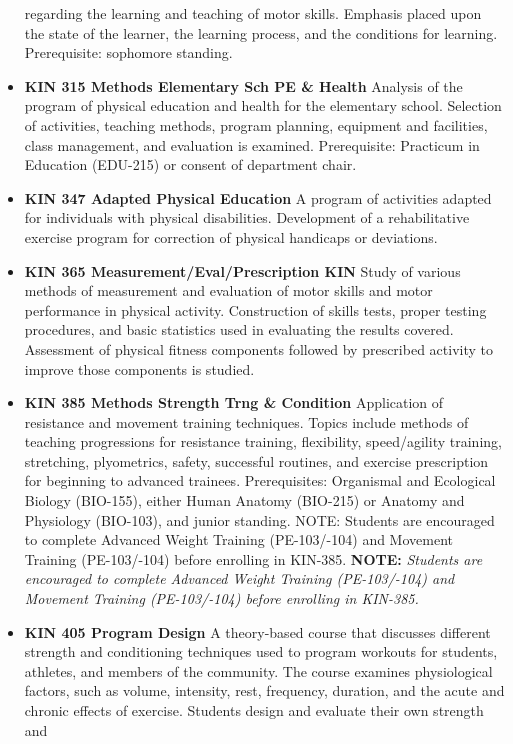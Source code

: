 \documentclass[
  letterpaper,
]{scrbook}
\begin{document}
\begin{itemize}
  regarding the learning and teaching of motor skills. Emphasis placed
  upon the state of the learner, the learning process, and the
  conditions for learning. Prerequisite: sophomore standing.
\item
  \textbf{KIN 315 Methods Elementary Sch PE \& Health} Analysis of the
  program of physical education and health for the elementary school.
  Selection of activities, teaching methods, program planning, equipment
  and facilities, class management, and evaluation is examined.
  Prerequisite: Practicum in Education (EDU-215) or consent of
  department chair.
\item
  \textbf{KIN 347 Adapted Physical Education} A program of activities
  adapted for individuals with physical disabilities. Development of a
  rehabilitative exercise program for correction of physical handicaps
  or deviations.
\item
  \textbf{KIN 365 Measurement/Eval/Prescription KIN} Study of various
  methods of measurement and evaluation of motor skills and motor
  performance in physical activity. Construction of skills tests, proper
  testing procedures, and basic statistics used in evaluating the
  results covered. Assessment of physical fitness components followed by
  prescribed activity to improve those components is studied.
\item
  \textbf{KIN 385 Methods Strength Trng \& Condition} Application of
  resistance and movement training techniques. Topics include methods of
  teaching progressions for resistance training, flexibility,
  speed/agility training, stretching, plyometrics, safety, successful
  routines, and exercise prescription for beginning to advanced
  trainees. Prerequisites: Organismal and Ecological Biology (BIO-155),
  either Human Anatomy (BIO-215) or Anatomy and Physiology (BIO-103),
  and junior standing. NOTE: Students are encouraged to complete
  Advanced Weight Training (PE-103/-104) and Movement Training
  (PE-103/-104) before enrolling in KIN-385. \textbf{NOTE:}
  \emph{Students are encouraged to complete Advanced Weight Training
  (PE-103/-104) and Movement Training (PE-103/-104) before enrolling in
  KIN-385.}
\item
  \textbf{KIN 405 Program Design} A theory-based course that discusses
  different strength and conditioning techniques used to program
  workouts for students, athletes, and members of the community. The
  course examines physiological factors, such as volume, intensity,
  rest, frequency, duration, and the acute and chronic effects of
  exercise. Students design and evaluate their own strength and

\end{itemize}
\end{document}
